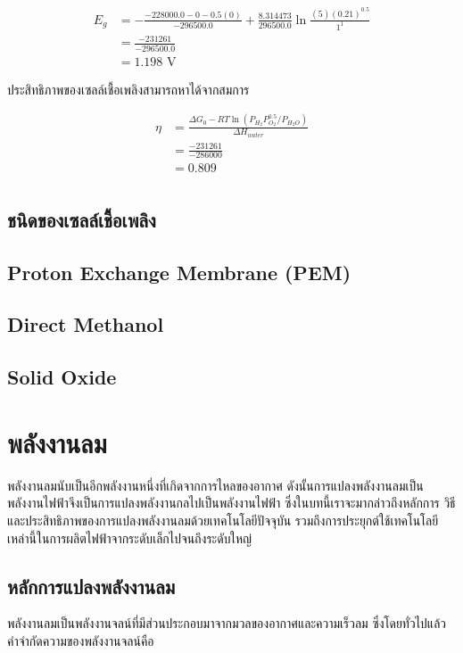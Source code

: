 \documentclass[a4paper,nobib,openany]{tufte-book}
\begin{document}
\begin{align*}
E_g &= - \frac{-228000.0-0- 0.5(0)}{-296500.0} + \frac{8.314473}{296500.0} \ln \frac{(5)(0.21)^{0.5}}{1^1} \\
&= \frac{-231261}{-296500.0} \\
&= 1.198\text{ V}
\end{align*}

ประสิทธิภาพของเซลล์เชื้อเพลิงสามารถหาได้จากสมการ

\begin{align*}
\eta &= \frac{\Delta G_0 - RT \ln (P_{H_2} P_{O_2}^{0.5}/ P_{H_2O})}{\Delta H_{water}} \\
&= \frac{-231261}{-286000} \\ 
&=0.809\\
\end{align*}

\section{ชนิดของเซลล์เชื้อเพลิง}
\label{sec:org7325fb0}
\section{Proton Exchange Membrane (PEM)}
\label{sec:org99fd088}
\section{Direct Methanol}
\label{sec:org8b44606}
\section{Solid Oxide}
\label{sec:orgbed868c}
\chapter{พลังงานลม}
\label{sec:orgb05a01b}
พลังงานลมนับเป็นอีกพลังงานหนึ่งที่เกิดจากการไหลของอากาศ
ดังนั้นการแปลงพลังงานลมเป็นพลังงานไฟฟ้าจึงเป็นการแปลงพลังงานกลไปเป็นพลังงานไฟฟ้า
ซึ่งในบทนี้เราจะมากล่าวถึงหลักการ วิธี
และประสิทธิภาพของการแปลงพลังงานลมด้วยเทคโนโลยีปัจจุบัน
รวมถึงการประยุกต์ใช้เทคโนโลยีเหล่านี้ในการผลิตไฟฟ้าจากระดับเล็กไปจนถึงระดับใหญ่

\section{หลักการแปลงพลังงานลม}
\label{sec:org5b28d16}
พลังงานลมเป็นพลังงานจลน์ที่มีส่วนประกอบมาจากมวลของอากาศและความเร็วลม
ซึ่งโดยทั่วไปแล้ว คำจำกัดความของพลังงานจลน์คือ
\end{document}
